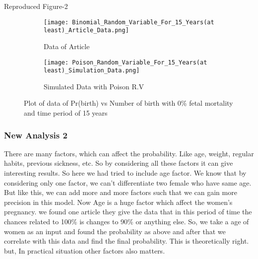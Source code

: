 \documentclass{article}
\begin{document}
\newpage
\item Reproduced Figure-2
\begin{figure}[htp]
\centering
\begin{subfigure}{.5\textwidth}
  \centering
  \texttt{[image: Binomial\_Random\_Variable\_For\_15\_Years(at least)\_Article\_Data.png]}
  \caption{Data of Article}
  \label{fig:sub1}
\end{subfigure}%
\begin{subfigure}{.5\textwidth}
  \centering
  \texttt{[image: Poison\_Random\_Variable\_For\_15\_Years(at least)\_Simulation\_Data.png]}
  \caption{Simulated Data with Poison R.V}
  \label{fig:sub2}
\end{subfigure}
\caption{Plot of data of Pr(birth) vs Number of birth with 0\% fetal mortality and time period of 15 years}
\label{fig:test}
\end{figure}

\subsubsection{New Analysis 2}
There are many factors, which can affect the probability. Like age, weight, regular habits, previous sickness, etc. So by considering all these factors it can give interesting results. So here we had tried to include age factor. We know that by considering only one factor, we can't differentiate two female who have same age. But like this, we can add more and more factors such that we can gain more precision in this model. Now Age is a huge factor which affect the women's pregnancy. we found one article they give the data that in this period of time the chances related to 100\% is changes to 90\% or anything else. So, we take a age of women as an input and found the probability as above and after that we correlate with this data and find the final probability. This is theoretically right. but, In practical situation other factors also matters.
\end{document}
